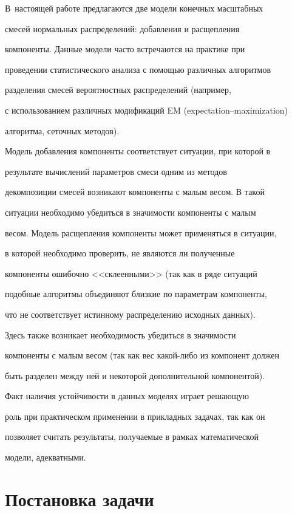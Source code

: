 В~настоящей работе предлагаются две модели конечных масштабных

смесей нормальных распределений: добавления и расщепления

компоненты. Данные модели часто встречаются на практике при

проведении статистического анализа с помощью различных алгоритмов

разделения смесей вероятностных распределений (например,

с использованием различных модификаций EM (expectation--maximization) 

алгоритма, сеточных методов).



Модель добавления компоненты соответствует ситуации, при которой в

результате вычислений параметров смеси одним из методов

декомпозиции смесей возникают компоненты с малым весом. В такой

ситуации необходимо убедиться в значимости компоненты с малым

весом. Модель расщепления компоненты может применяться в ситуации,

в которой необходимо проверить, не являются ли полученные

компоненты ошибочно <<склеенными>> (так как в ряде ситуаций

подобные алгоритмы объединяют близкие по параметрам компоненты,

что не соответствует истинному распределению исходных данных).

Здесь также возникает необходимость убедиться в значимости

компоненты с малым весом (так как вес ка\-кой-ли\-бо из компонент должен

быть разделен между ней и некоторой дополнительной компонентой).

Факт наличия устойчивости в данных моделях играет решающую

роль при практическом применении в прикладных задачах, так как он

позволяет считать результаты, получаемые в рамках математической

модели, адекватными.



\section{Постановка задачи}

